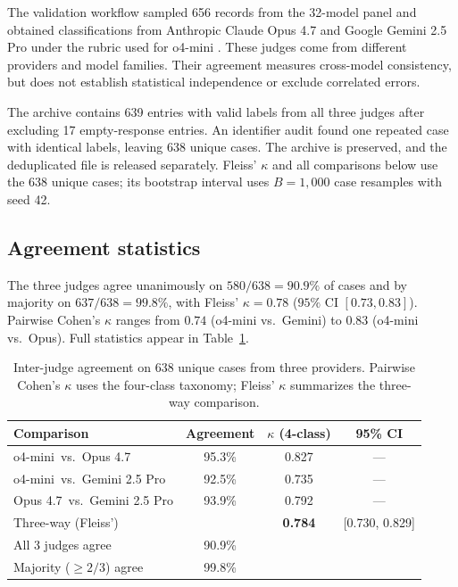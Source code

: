 \documentclass{article}
\begin{document}
The validation workflow sampled 656 records from the 32-model panel and obtained classifications from Anthropic Claude Opus 4.7 \citep{anthropic2026opus47} and Google Gemini 2.5 Pro \citep{geminiteam2025gemini25} under the rubric used for o4-mini \citep{openai2025o4mini}. These judges come from different providers and model families. Their agreement measures cross-model consistency, but does not establish statistical independence or exclude correlated errors.

The archive contains 639 entries with valid labels from all three judges after excluding 17 empty-response entries. An identifier audit found one repeated case with identical labels, leaving 638 unique cases. The archive is preserved, and the deduplicated file is released separately. Fleiss' $\kappa$ and all comparisons below use the 638 unique cases; its bootstrap interval uses $B=1{,}000$ case resamples with seed 42.

\subsection{Agreement statistics}

The three judges agree unanimously on $580/638=90.9\%$ of cases and by majority on $637/638=99.8\%$, with Fleiss' $\kappa=0.78$ ($95\%$ CI $[0.73, 0.83]$). Pairwise Cohen's $\kappa$ ranges from $0.74$ (o4-mini vs.\ Gemini) to $0.83$ (o4-mini vs.\ Opus). Full statistics appear in Table~\ref{tab:crossjudge}.

\begin{table}[h]
\centering
\small
\caption{Inter-judge agreement on 638 unique cases from three providers. Pairwise Cohen's $\kappa$ uses the four-class taxonomy; Fleiss' $\kappa$ summarizes the three-way comparison.}
\label{tab:crossjudge}
\begin{tabular}{lccc}
\toprule
\textbf{Comparison} & \textbf{Agreement} & \textbf{$\kappa$ (4-class)} & \textbf{95\% CI} \\
\midrule
o4-mini \,vs.\, Opus 4.7 & 95.3\% & 0.827 & --- \\
o4-mini \,vs.\, Gemini 2.5 Pro & 92.5\% & 0.735 & --- \\
Opus 4.7 \,vs.\, Gemini 2.5 Pro & 93.9\% & 0.792 & --- \\
\midrule
Three-way (Fleiss') & & \textbf{0.784} & [0.730, 0.829] \\
All 3 judges agree & 90.9\% & & \\
Majority ($\geq 2/3$) agree & 99.8\% & & \\
\bottomrule
\end{tabular}
\end{table}
\end{document}
